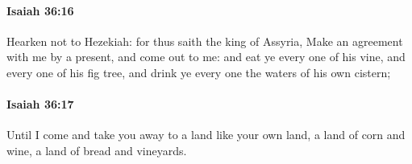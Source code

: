 		\paragraph{Isaiah 36:16} %
			\label{ISAIAH-36-16}

			Hearken not to Hezekiah: for thus saith the king of Assyria, Make an agreement with me by a present, and come out to me: and eat ye every one of his vine, and every one of his fig tree, and drink ye every one the waters of his own cistern;


		\paragraph{Isaiah 36:17} %
			\label{ISAIAH-36-17}

			Until I come and take you away to a land like your own land, a land of corn and wine, a land of bread and vineyards.


